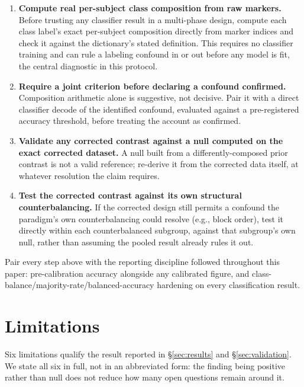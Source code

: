 \documentclass[preprint,12pt]{elsarticle}
\begin{document}
\begin{enumerate}
\item \textbf{Compute real per-subject class composition from raw markers.} Before trusting any classifier result in a multi-phase design, compute each class label's exact per-subject composition directly from marker indices and check it against the dictionary's stated definition. This requires no classifier training and can rule a labeling confound in or out before any model is fit, the central diagnostic in this protocol.
\item \textbf{Require a joint criterion before declaring a confound confirmed.} Composition arithmetic alone is suggestive, not decisive. Pair it with a direct classifier decode of the identified confound, evaluated against a pre-registered accuracy threshold, before treating the account as confirmed.
\item \textbf{Validate any corrected contrast against a null computed on the exact corrected dataset.} A null built from a differently-composed prior contrast is not a valid reference; re-derive it from the corrected data itself, at whatever resolution the claim requires.
\item \textbf{Test the corrected contrast against its own structural counterbalancing.} If the corrected design still permits a confound the paradigm's own counterbalancing could resolve (e.g., block order), test it directly within each counterbalanced subgroup, against that subgroup's own null, rather than assuming the pooled result already rules it out.
\end{enumerate}

Pair every step above with the reporting discipline followed throughout this paper: pre-calibration accuracy alongside any calibrated figure, and class-balance/majority-rate/balanced-accuracy hardening on every classification result.

\section{Limitations}\label{sec:limitations}

Six limitations qualify the result reported in \S\ref{sec:results} and \S\ref{sec:validation}. We state all six in full, not in an abbreviated form: the finding being positive rather than null does not reduce how many open questions remain around it.
\end{document}
